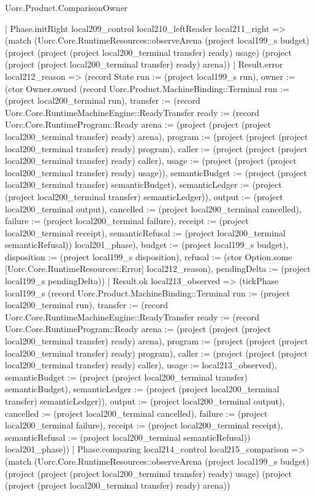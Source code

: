 \begin{lexlean}{Uorc.Product.ComparisonOwner}
\begin{semanticmodule}
{    | Phase.initRight local209_control local210_leftReader local211_right => (match (Uorc.Core.RuntimeResources::observeArena (project local199_s budget) (project (project (project local200_terminal transfer) ready) usage) (project (project (project local200_terminal transfer) ready) arena))
      | Result.error local212_reason => (record State {run := (project local199_s run), owner := (ctor Owner.owned (record Uorc.Product.MachineBinding::Terminal {run := (project local200_terminal run), transfer := (record Uorc.Core.RuntimeMachineEngine::ReadyTransfer {ready := (record Uorc.Core.RuntimeProgram::Ready {arena := (project (project (project local200_terminal transfer) ready) arena), program := (project (project (project local200_terminal transfer) ready) program), caller := (project (project (project local200_terminal transfer) ready) caller), usage := (project (project (project local200_terminal transfer) ready) usage)}), semanticBudget := (project (project local200_terminal transfer) semanticBudget), semanticLedger := (project (project local200_terminal transfer) semanticLedger)}), output := (project local200_terminal output), cancelled := (project local200_terminal cancelled), failure := (project local200_terminal failure), receipt := (project local200_terminal receipt), semanticRefusal := (project local200_terminal semanticRefusal)}) local201_phase), budget := (project local199_s budget), disposition := (project local199_s disposition), refusal := (ctor Option.some [Uorc.Core.RuntimeResources::Error] local212_reason), pendingDelta := (project local199_s pendingDelta)})
      | Result.ok local213_observed => (tickPhase local199_s (record Uorc.Product.MachineBinding::Terminal {run := (project local200_terminal run), transfer := (record Uorc.Core.RuntimeMachineEngine::ReadyTransfer {ready := (record Uorc.Core.RuntimeProgram::Ready {arena := (project (project (project local200_terminal transfer) ready) arena), program := (project (project (project local200_terminal transfer) ready) program), caller := (project (project (project local200_terminal transfer) ready) caller), usage := local213_observed}), semanticBudget := (project (project local200_terminal transfer) semanticBudget), semanticLedger := (project (project local200_terminal transfer) semanticLedger)}), output := (project local200_terminal output), cancelled := (project local200_terminal cancelled), failure := (project local200_terminal failure), receipt := (project local200_terminal receipt), semanticRefusal := (project local200_terminal semanticRefusal)}) local201_phase))
    | Phase.comparing local214_control local215_comparison => (match (Uorc.Core.RuntimeResources::observeArena (project local199_s budget) (project (project (project local200_terminal transfer) ready) usage) (project (project (project local200_terminal transfer) ready) arena))
}
\end{semanticmodule}
\end{lexlean}
